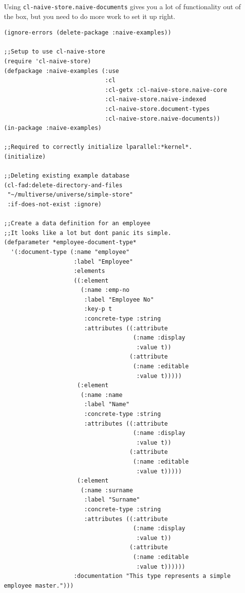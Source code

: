\documentclass[11pt]{article}
\begin{document}
Using \texttt{cl-naive-store.naive-documents} gives you a lot of functionality out of the
box, but you need to do more work to set it up right.

\begin{verbatim}
(ignore-errors (delete-package :naive-examples))

;;Setup to use cl-naive-store
(require 'cl-naive-store)
(defpackage :naive-examples (:use
                             :cl
                             :cl-getx :cl-naive-store.naive-core
                             :cl-naive-store.naive-indexed
                             :cl-naive-store.document-types
                             :cl-naive-store.naive-documents))
(in-package :naive-examples)

;;Required to correctly initialize lparallel:*kernel*.
(initialize)

;;Deleting existing example database
(cl-fad:delete-directory-and-files
 "~/multiverse/universe/simple-store"
 :if-does-not-exist :ignore)

;;Create a data definition for an employee
;;It looks like a lot but dont panic its simple.
(defparameter *employee-document-type*
  '(:document-type (:name "employee"
                    :label "Employee"
                    :elements
                    ((:element
                      (:name :emp-no
                       :label "Employee No"
                       :key-p t
                       :concrete-type :string
                       :attributes ((:attribute
                                     (:name :display
                                      :value t))
                                    (:attribute
                                     (:name :editable
                                      :value t)))))
                     (:element
                      (:name :name
                       :label "Name"
                       :concrete-type :string
                       :attributes ((:attribute
                                     (:name :display
                                      :value t))
                                    (:attribute
                                     (:name :editable
                                      :value t)))))
                     (:element
                      (:name :surname
                       :label "Surname"
                       :concrete-type :string
                       :attributes ((:attribute
                                     (:name :display
                                      :value t))
                                    (:attribute
                                     (:name :editable
                                      :value t))))))
                    :documentation "This type represents a simple employee master.")))


\end{verbatim}
\end{document}
